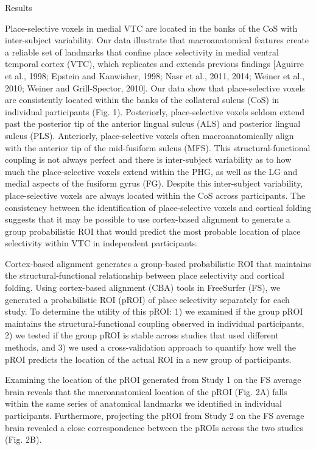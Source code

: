 Results

Place-selective voxels in medial VTC are located in the banks of the CoS with
inter-subject variability.
%
Our data illustrate that macroanatomical features create a reliable set of
landmarks that confine place selectivity in medial ventral temporal cortex
(VTC), which replicates and extends previous findings [Aguirre et al., 1998;
Epstein and Kanwisher, 1998; Nasr et al., 2011, 2014; Weiner et al., 2010;
Weiner and Grill-Spector, 2010].
%
Our data show that place-selective voxels are consistently located within the
banks of the collateral sulcus (CoS) in individual participants (Fig. 1).
%
Posteriorly, place-selective voxels seldom extend past the posterior tip of the
anterior lingual sulcus (ALS) and posterior lingual sulcus (PLS).
%
Anteriorly, place-selective voxels often macroanatomically align with the
anterior tip of the mid-fusiform sulcus (MFS).
%
This structural-functional coupling is not always perfect and there is
inter-subject variability as to how much the place-selective voxels extend
within the PHG, as well as the LG and medial aspects of the fusiform gyrus (FG).
%
Despite this inter-subject variability, place-selective voxels are always
located within the CoS across participants.
%
The consistency between the identification of place-selective voxels and
cortical folding suggests that it may be possible to use cortex-based alignment
to generate a group probabilistic ROI that would predict the most probable
location of place selectivity within VTC in independent participants.

Cortex-based alignment generates a group-based probabilistic ROI that maintains
the structural-functional relationship between place selectivity and cortical
folding.
%
Using cortex-based alignment (CBA) tools in FreeSurfer (FS), we generated a
probabilistic ROI (pROI) of place selectivity separately for each study.
%
To determine the utility of this pROI:
%
1) we examined if the group pROI maintains the structural-functional coupling
observed in individual participants,
%
2) we tested if the group pROI is stable across studies that used different
methods, and
%
3) we used a cross-validation approach to quantify how well the pROI predicts
the location of the actual ROI in a new group of participants.

%
Examining the location of the pROI generated from Study 1 on the FS average
brain reveals that the macroanatomical location of the pROI (Fig. 2A) falls
within the same series of anatomical landmarks we identified in individual
participants.
%
Furthermore, projecting the pROI from Study 2 on the FS average
brain revealed a close correspondence between the pROIs across the two studies
(Fig. 2B).

